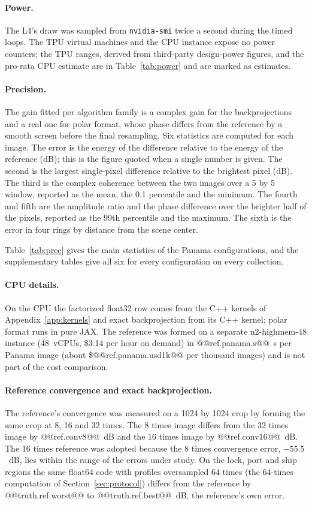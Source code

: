\documentclass[11pt]{article}
\begin{document}
\paragraph{Power.} The L4's draw was sampled from \texttt{nvidia-smi} twice a second during the timed loops. The TPU virtual machines and the CPU instance expose no power counters; the TPU ranges, derived from third-party design-power figures, and the pro-rata CPU estimate are in Table~\ref{tab:power} and are marked as estimates.



\paragraph{Precision.} The gain fitted per algorithm family is a complex gain for the backprojections and a real one for polar format, whose phase differs from the reference by a smooth screen before the final resampling. Six statistics are computed for each image. The error is the energy of the difference relative to the energy of the reference (dB); this is the figure quoted when a single number is given. The second is the largest single-pixel difference relative to the brightest pixel (dB). The third is the complex coherence between the two images over a 5 by 5 window, reported as the mean, the 0.1 percentile and the minimum. The fourth and fifth are the amplitude ratio and the phase difference over the brighter half of the pixels, reported as the 99th percentile and the maximum. The sixth is the error in four rings by distance from the scene center.

Table~\ref{tab:prec} gives the main statistics of the Panama configurations, and the supplementary tables give all six for every configuration on every collection.

\paragraph{CPU details.} On the CPU the factorized float32 row comes from the C++ kernels of Appendix~\ref{app:kernels} and exact backprojection from its C++ kernel; polar format runs in pure JAX. The reference was formed on a separate n2-highmem-48 instance (48~vCPUs, \$3.14 per hour on demand) in @@ref.panama.s@@~s per Panama image (about \$@@ref.panama.usd1k@@ per thousand images) and is not part of the cost comparison.

\paragraph{Reference convergence and exact backprojection.} The reference's convergence was measured on a 1024 by 1024 crop by forming the same crop at 8, 16 and 32 times. The 8 times image differs from the 32 times image by @@ref.conv8@@~dB and the 16 times image by @@ref.conv16@@~dB. The 16 times reference was adopted because the 8 times convergence error, $-55.5$~dB, lies within the range of the errors under study. On the lock, port and ship regions the same float64 code with profiles oversampled 64 times (the 64-times computation of Section~\ref{sec:protocol}) differs from the reference by @@truth.ref.worst@@ to @@truth.ref.best@@~dB, the reference's own error.
\end{document}
